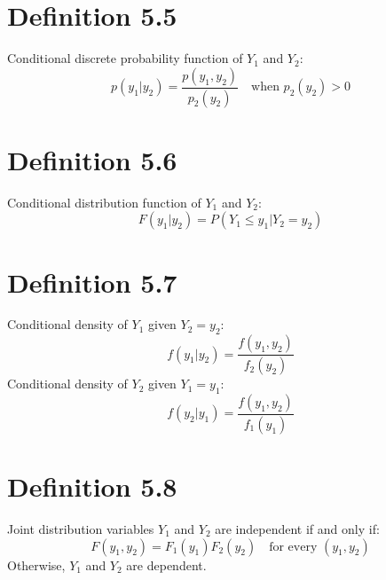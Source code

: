 \documentclass[12pt]{article}
\begin{document}
\section{Definition 5.5}
Conditional discrete probability function of $Y_1$ and $Y_2$:
\[
p(y_1|y_2) = \frac{p(y_1, y_2)}{p_2(y_2)} \quad \text{when } p_2(y_2) > 0
\]

\section{Definition 5.6}
Conditional distribution function of $Y_1$ and $Y_2$:
\[
F(y_1|y_2) = P(Y_1 \leq y_1 | Y_2 = y_2)
\]

\section{Definition 5.7}
Conditional density of $Y_1$ given $Y_2 = y_2$:
\[
f(y_1|y_2) = \frac{f(y_1, y_2)}{f_2(y_2)}
\]
Conditional density of $Y_2$ given $Y_1 = y_1$:
\[
f(y_2|y_1) = \frac{f(y_1, y_2)}{f_1(y_1)}
\]

\section{Definition 5.8}
Joint distribution variables $Y_1$ and $Y_2$ are independent if and only if:
\[
F(y_1, y_2) = F_1(y_1)F_2(y_2) \quad \text{for every } (y_1, y_2)
\]
Otherwise, $Y_1$ and $Y_2$ are dependent.
\end{document}
